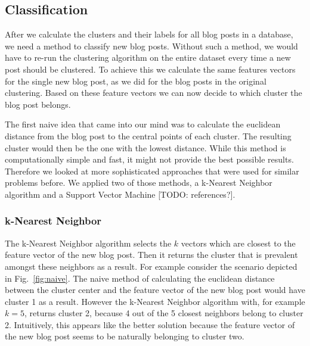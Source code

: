 
\subsection{Classification}
\label{sec:classification}

After we calculate the clusters and their labels for all blog posts in a database, we need a method to classify new blog posts.
Without such a method, we would have to re-run the clustering algorithm on the entire dataset every time a new post should be clustered.
To achieve this we calculate the same features vectors for the single new blog post, as we did for the blog posts in the original clustering.
Based on these feature vectors we can now decide to which cluster the blog post belongs.


The first naive idea that came into our mind was to calculate the euclidean distance from the blog post to the central points of each cluster.
The resulting cluster would then be the one with the lowest distance.
While this method is computationally simple and fast, it might not provide the best possible results.
Therefore we looked at more sophisticated approaches that were used for similar problems before.
We applied two of those methods, a k-Nearest Neighbor algorithm and a Support Vector Machine [TODO: references?].


\subsubsection{k-Nearest Neighbor}
\label{sec:k_nearest_neighbor}


The k-Nearest Neighbor algorithm selects the $k$ vectors which are closest to the feature vector of the new blog post.
Then it returns the cluster that is prevalent amongst these neighbors as a result.
For example consider the scenario depicted in Fig.~\ref{fig:naive}.
The naive method of calculating the euclidean distance between the cluster center and the feature vector of the new blog post would have cluster 1 as a result.
However the k-Nearest Neighbor algorithm with, for example $k=5$, returns cluster 2, because 4 out of the 5 closest neighbors belong to cluster 2.
Intuitively, this appears like the better solution because the feature vector of the new blog post seems to be naturally belonging to cluster two.


